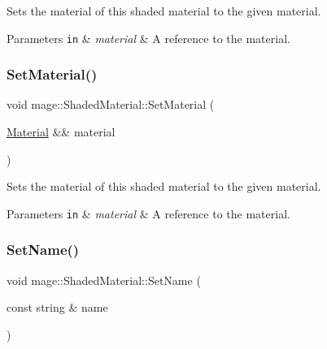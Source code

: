 Sets the material of this shaded material to the given material.


\begin{DoxyParams}[1]{Parameters}
\mbox{\tt in}  & {\em material} & A reference to the material. \\
\hline
\end{DoxyParams}
\hypertarget{structmage_1_1_shaded_material_a340a8eb8690a6ba809c33432607d02dd}{}\label{structmage_1_1_shaded_material_a340a8eb8690a6ba809c33432607d02dd} 
\subsubsection{\texorpdfstring{Set\+Material()}{SetMaterial()}\hspace{0.1cm}{\footnotesize\ttfamily [2/2]}}
{\footnotesize\ttfamily void mage\+::\+Shaded\+Material\+::\+Set\+Material (\begin{DoxyParamCaption}\item[{\hyperlink{structmage_1_1_material}{Material} \&\&}]{material }\end{DoxyParamCaption})}

Sets the material of this shaded material to the given material.


\begin{DoxyParams}[1]{Parameters}
\mbox{\tt in}  & {\em material} & A reference to the material. \\
\hline
\end{DoxyParams}
\hypertarget{structmage_1_1_shaded_material_a3f8d05c818362ef37bfcf9a02769d0ff}{}\label{structmage_1_1_shaded_material_a3f8d05c818362ef37bfcf9a02769d0ff} 
\subsubsection{\texorpdfstring{Set\+Name()}{SetName()}\hspace{0.1cm}{\footnotesize\ttfamily [1/2]}}
{\footnotesize\ttfamily void mage\+::\+Shaded\+Material\+::\+Set\+Name (\begin{DoxyParamCaption}\item[{const string \&}]{name }\end{DoxyParamCaption})}

